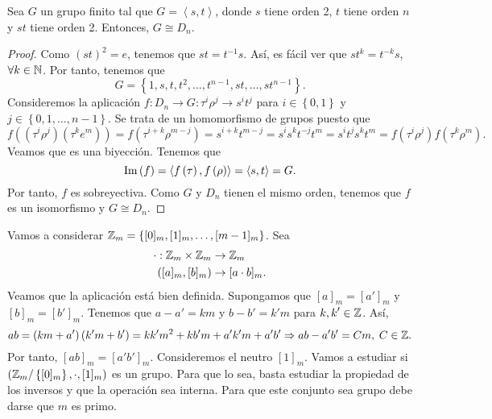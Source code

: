 \begin{prop}
Sea $\displaystyle G $ un grupo finito tal que $\displaystyle G = \left\langle s, t \right\rangle  $, donde $\displaystyle s $ tiene orden 2, $\displaystyle t $ tiene orden $\displaystyle n $ y $\displaystyle st $ tiene orden 2. Entonces, $\displaystyle G \cong D_{n} $. 
\end{prop}
\begin{proof}
Como $\displaystyle \left(st\right)^{2} = e $, tenemos que $\displaystyle st = t ^{-1}s $. Así, es fácil ver que $\displaystyle st^{k} = t ^{-k}s$, $\displaystyle \forall k \in \mathbb{N} $. Por tanto, tenemos que 
\[G = \left\{ 1, s, t, t ^{2}, \ldots, t ^{n-1}, st, \ldots, s t ^{n-1}\right\}  .\]
Consideremos la aplicación $\displaystyle f : D_{n} \to G : \tau^{i}\rho^{j} \to s ^{i}t ^{j} $ para $\displaystyle i \in \left\{ 0,1\right\}  $ y $\displaystyle j \in \left\{ 0, 1, \ldots, n -1\right\}  $. Se trata de un homomorfismo de grupos puesto que 
\[f\left(\left(\tau^{i}\rho^{j}\right)\left(\tau^{k}e^{m}\right)\right) = f\left(\tau^{i +k}\rho^{m - j}\right) = s ^{i + k} t ^{m - j} = s^{i}s^{k}t ^{-j}t^{m} = s^{i}t ^{j}s^{k}t ^{m} = f\left(\tau^{i}\rho^{j}\right)f\left(\tau^{k}\rho^{m}\right) .\]
Veamos que es una biyección. Tenemos que 
\[\operatorname{Im}\left(f\right) = \left\langle f\left(\tau\right), f\left(\rho\right) \right\rangle = \left\langle s, t \right\rangle  = G .\]
Por tanto, $\displaystyle f $ es sobreyectiva. Como $\displaystyle G $ y $\displaystyle D_{n} $ tienen el mismo orden, tenemos que $\displaystyle f $ es un isomorfismo y $\displaystyle G \cong D_{n} $. 
\end{proof}
\begin{eg}
Vamos a considerar $\displaystyle \mathbb{Z}_{m} = \left\{ [0]_{m}, [1]_{m}, \ldots, [m - 1]_{m}\right\}  $. Sea 
\[
\begin{split}
	\cdot : \mathbb{Z}_{m}\times \mathbb{Z}_{m} & \to \mathbb{Z}_{m} \\
	\left([a]_{m},[b]_{m}\right) & \to [a \cdot b]_{m}.
\end{split}
\]
Veamos que la aplicación está bien definida. Supongamos que $\displaystyle [a]_{m} = [a']_{m} $ y $\displaystyle [b]_{m} = [b']_{m} $. Tenemos que $\displaystyle a - a' = km  $ y $\displaystyle b -b' = k'm $ para $\displaystyle k,k' \in \mathbb{Z} $. Así,
\[ab = \left(km + a'\right)\left(k'm+b'\right) = k k' m^{2} + kb'm + a'k'm + a'b' \Rightarrow ab - a'b' = Cm, \; C \in \mathbb{Z} .\]
Por tanto, $\displaystyle [ab]_{m} = [a'b']_{m} $. Consideremos el neutro $\displaystyle [1]_{m} $. Vamos a estudiar si $\displaystyle \left(\mathbb{Z}_{m}/ \left\{ [0]_{m}\right\} , \cdot , [1]_{m}\right) $ es un grupo. Para que lo sea, basta estudiar la propiedad de los inversos y que la operación sea interna. Para que este conjunto sea grupo debe darse que $\displaystyle m $ es primo. 
\end{eg}

